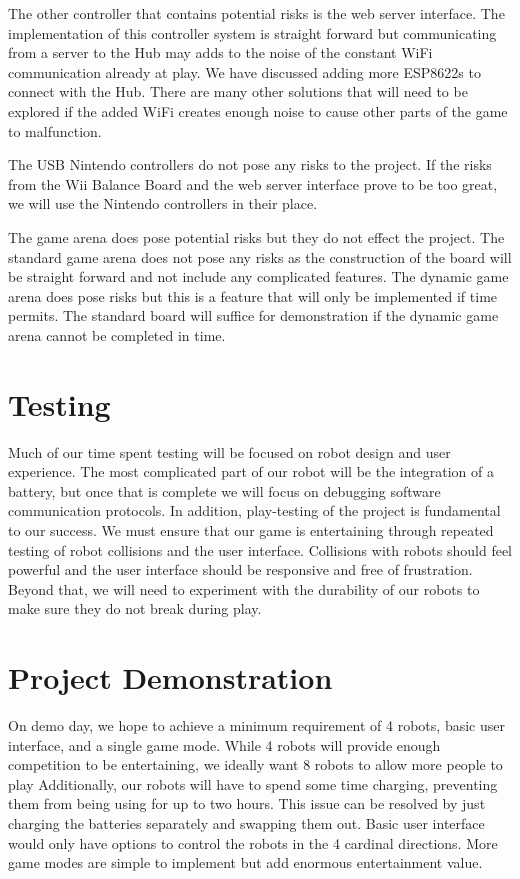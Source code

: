 \documentclass[11pt]{ieeeconf}
\begin{document}
The other controller that contains potential risks is the web server interface. The implementation of this controller system is straight forward but communicating from a server to the Hub may adds to the noise of the constant WiFi communication already at play. We have discussed adding more ESP8622s to connect with the Hub. There are many other solutions that will need to be explored if the added WiFi creates enough noise to cause other parts of the game to malfunction.  

The USB Nintendo controllers do not pose any risks to the project. If the risks from the Wii Balance Board and the web server interface prove to be too great, we will use the Nintendo controllers in their place.  

The game arena does pose potential risks but they do not effect the project. The standard game arena does not pose any risks as the construction of the board will be straight forward and not include any complicated features. The dynamic game arena does pose risks but this is a feature that will only be implemented if time permits. The standard board will suffice for demonstration if the dynamic game arena cannot be completed in time.

\section{Testing}
Much of our time spent testing will be focused on robot design and user experience. The most complicated part of our robot will be the integration of a battery, but once that is complete we will focus on debugging software communication protocols. In addition, play-testing of the project is fundamental to our success. We must ensure that our game is entertaining through repeated testing of robot collisions and the user interface. Collisions with robots should feel powerful and the user interface should be responsive and free of frustration. Beyond that, we will need to experiment with the durability of our robots to make sure they do not break during play.

\section{Project Demonstration}

On demo day, we hope to achieve a minimum requirement of 4 robots, basic user interface, and a single game mode. While 4 robots will provide enough competition to be entertaining, we ideally want 8 robots to allow more people to play Additionally, our robots will have to spend some time charging, preventing them from being using for up to two hours. This issue can be resolved by just charging the batteries separately and swapping them out. Basic user interface would only have options to control the robots in the 4 cardinal directions. More game modes are simple to implement but add enormous entertainment value.
\end{document}
